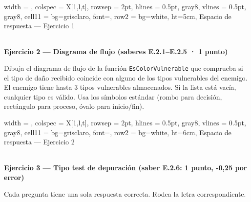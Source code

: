 \documentclass[a4paper,12pt]{article}
\begin{document}
\vspace{0.15cm}
\begin{longtblr}{
  width = \textwidth,
  colspec = {X[1,l,t]},
  rowsep = 2pt,
  hlines = {0.5pt, gray8},
  vlines = {0.5pt, gray8},
  cell{1}{1} = {bg=grisclaro, font=\small\bfseries},
  row{2} = {bg=white, ht=5cm},
}
Espacio de respuesta — Ejercicio 1 \\
~ \\
\end{longtblr}

\vspace{0.4cm}
\noindent\textbf{Ejercicio 2 — Diagrama de flujo \small(saberes E.2.1–E.2.5 · 1 punto)\normalsize}

\vspace{0.15cm}
\noindent Dibuja el diagrama de flujo de la función \texttt{EsColorVulnerable} que comprueba si el tipo de daño recibido coincide con alguno de los tipos vulnerables del enemigo. El enemigo tiene hasta 3 tipos vulnerables almacenados. Si la lista está vacía, cualquier tipo es válido. Usa los símbolos estándar (rombo para decisión, rectángulo para proceso, óvalo para inicio/fin).

\vspace{0.15cm}
\begin{longtblr}{
  width = \textwidth,
  colspec = {X[1,l,t]},
  rowsep = 2pt,
  hlines = {0.5pt, gray8},
  vlines = {0.5pt, gray8},
  cell{1}{1} = {bg=grisclaro, font=\small\bfseries},
  row{2} = {bg=white, ht=6cm},
}
Espacio de respuesta — Ejercicio 2 \\
~ \\
\end{longtblr}

\vspace{0.4cm}
\noindent\textbf{Ejercicio 3 — Tipo test de depuración \small(saber E.2.6: 1 punto, -0,25 por error)\normalsize}

\vspace{0.15cm}
\noindent Cada pregunta tiene una sola respuesta correcta. Rodea la letra correspondiente.
\end{document}

